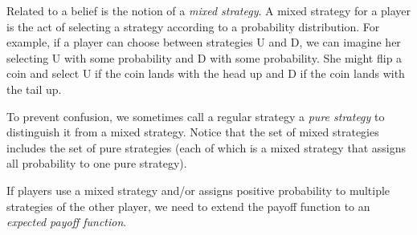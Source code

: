 Related to a belief is the notion of a \emph{mixed strategy}. A mixed strategy for a player is the act of selecting a strategy according to a probability distribution. For example, if a player can choose between strategies U and D, we can imagine her selecting U with some probability and D with some probability. She might flip a coin and select U if the coin lands with the head up and D if the coin lands with the tail up.

To prevent confusion, we sometimes call a regular strategy a \emph{pure strategy} to distinguish it from a mixed strategy. Notice that the set of mixed strategies includes the set of pure strategies (each of which is a mixed strategy that assigns all probability to one pure strategy).

If players use a mixed strategy and/or assigns positive probability to multiple strategies of the other player, we need to extend the payoff function to an \emph{expected payoff function}.



